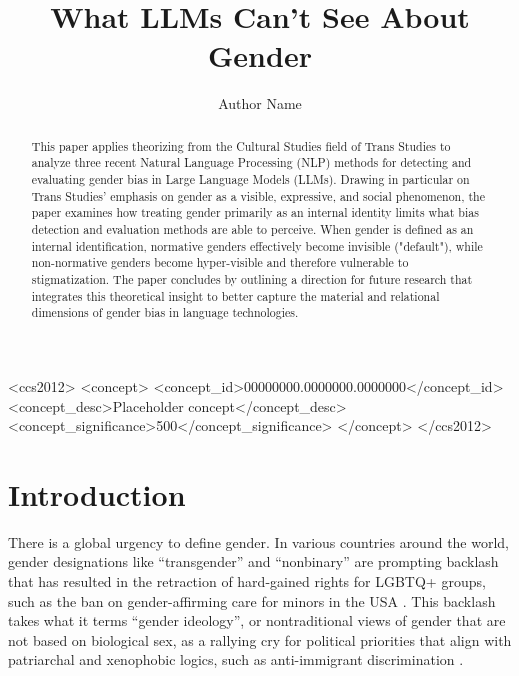 \documentclass[anonymous,review]{acmart}
\begin{document}
\title{What LLMs Can't See About Gender}

\author{Author Name}

\renewcommand{\shortauthors}{Author Name}

\begin{abstract}
This paper applies theorizing from the Cultural Studies field of Trans Studies to analyze three recent Natural Language Processing (NLP) methods for detecting and evaluating gender bias in Large Language Models (LLMs). Drawing in particular on Trans Studies’ emphasis on gender as a visible, expressive, and social phenomenon, the paper examines how treating gender primarily as an internal identity limits what bias detection and evaluation methods are able to perceive. When gender is defined as an internal identification, normative genders effectively become invisible ("default"), while non-normative genders become hyper-visible and therefore vulnerable to stigmatization. The paper concludes by outlining a direction for future research that integrates this theoretical insight to better capture the material and relational dimensions of gender bias in language technologies.
\end{abstract}

\begin{CCSXML}
<ccs2012>
 <concept>
  <concept_id>00000000.0000000.0000000</concept_id>
  <concept_desc>Placeholder concept</concept_desc>
  <concept_significance>500</concept_significance>
 </concept>
</ccs2012>
\end{CCSXML}



\maketitle


\section{Introduction}
There is a global urgency to define gender. In various countries around the world, gender designations like “transgender” and “nonbinary” are prompting backlash that has resulted in the retraction of hard-gained rights for LGBTQ+ groups, such as the ban on gender-affirming care for minors in the USA \citep{karni:2025}. This backlash takes what it terms “gender ideology”, or nontraditional views of gender that are not based on biological sex, as a rallying cry for political priorities that align with patriarchal and xenophobic logics, such as anti-immigrant discrimination \citep{butler:2024,hrc:2025,shakhsari:2013}.
\end{document}
